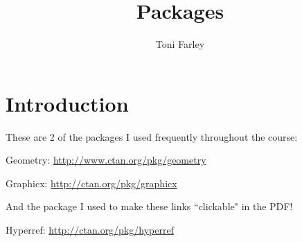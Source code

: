 \documentclass{article}
\title{Packages}
\author{Toni Farley}
\date{}
\begin{document}
\maketitle

\section{Introduction}

These are 2 of the packages I used frequently throughout the course:

Geometry: \url{http://www.ctan.org/pkg/geometry}   

Graphicx: \url{http://ctan.org/pkg/graphicx}

\noindent And the package I used to make these links ``clickable" in the PDF!

Hyperref: \url{http://ctan.org/pkg/hyperref}
\end{document}
